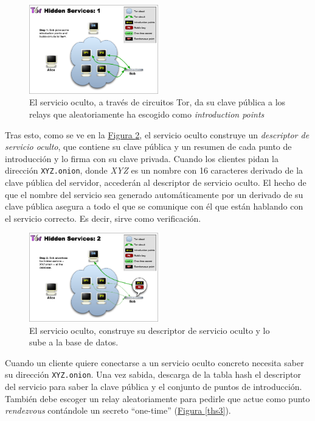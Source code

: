 \documentclass[10pt,a4paper,spanish]{article}
\begin{document}
\begin{figure}[!h]
    \centering
    \includegraphics[width=0.5\textwidth]{THS-1}
    \caption{El servicio oculto, a través de circuitos Tor, da su clave pública a los relays que aleatoriamente ha escogido como \textit{introduction points}}
    \label{ths1}
\end{figure}

Tras esto, como se ve en la \hyperref[ths2]{Figura \ref*{ths2}}, el servicio oculto construye un \textit{descriptor de servicio oculto}, que contiene su clave pública y un resumen de cada punto de introducción y lo firma con su clave privada. Cuando los clientes pidan la dirección \texttt{XYZ.onion}, donde \textit{XYZ} es un nombre con 16 caracteres derivado de la clave pública del servidor, accederán al descriptor de servicio oculto. El hecho de que el nombre del servicio sea generado automáticamente por un derivado de su clave pública asegura a todo el que se comunique con él que están hablando con el servicio correcto. Es decir, sirve como verificación.

\begin{figure}[!h]
    \centering
    \includegraphics[width=0.5\textwidth]{THS-2}
    \caption{El servicio oculto, construye su descriptor de servicio oculto y lo sube a la base de datos.}
    \label{ths2}
\end{figure}

Cuando un cliente quiere conectarse a un servicio oculto concreto necesita saber su dirección \texttt{XYZ.onion}. Una vez sabida, descarga de la tabla hash el descriptor del servicio para saber la clave pública y el conjunto de puntos de introducción. También debe escoger un relay aleatoriamente para pedirle que actue como punto \textit{rendezvous} contándole un secreto ``one-time'' (\hyperref[ths3]{Figura \ref*{ths3}}).
\end{document}
